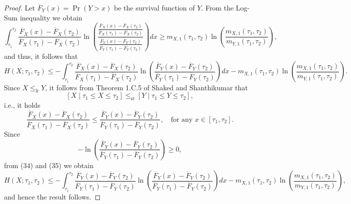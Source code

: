 \documentclass[11pt]{article}
\begin{document}
\begin{proof}
	Let $\overline{F}_Y(x)=\Pr(Y>x)$ be the survival function of $Y$. From the Log-Sum inequality we obtain
	\begin{equation}
			\textstyle \int_{\tau_1}^{\tau_2} \frac{\overline{F}_X(x)-\overline{F}_X(\tau_2)}{\overline{F}_X(\tau_1)-\overline{F}_X(\tau_2)} \ln\left( \frac{ \frac{\overline{F}_X(x)-\overline{F}_X(\tau_2)}{\overline{F}_X(\tau_1)-\overline{F}_X(\tau_2)} }{ \frac{\overline{F}_Y(x)-\overline{F}_Y(\tau_2)}{\overline{F}_Y(\tau_1)-\overline{F}_Y(\tau_2)} } \right)dx \geq m_{X,1}(\tau_1,\tau_2 ) \ln\left( \frac{m_{X,1}(\tau_1,\tau_2 )}{m_{Y,1}(\tau_1,\tau_2 )} \right),
	\end{equation}
	and thus, it follows that
	\begin{equation}
			\textstyle H(X;\tau_1,\tau_2 ) \leq -\int_{\tau_1}^{\tau_2} \frac{\overline{F}_X(x)-\overline{F}_X(\tau_2)}{\overline{F}_X(\tau_1)-\overline{F}_X(\tau_2)} \ln\left( \frac{\overline{F}_Y(x)-\overline{F}_Y(\tau_2)}{\overline{F}_Y(\tau_1)-\overline{F}_Y(\tau_2)} \right)dx - m_{X,1}(\tau_1,\tau_2 ) \ln\left( \frac{m_{X,1}(\tau_1,\tau_2 )}{m_{Y,1}(\tau_1,\tau_2 )} \right).
	\end{equation}
	Since $X\leq_{\text{lr}} Y$, it follows from Theorem 1.C.5 of Shaked and Shanthikumar \cite{Shaked2007} that
	$$ \textstyle [X \mid \tau_1 \leq X \leq \tau_2] \leq_{\text{st}} [Y \mid \tau_1 \leq Y \leq \tau_2], $$
	i.e., it holds
	\begin{equation}
		\textstyle \frac{\overline{F}_X(x)-\overline{F}_X(\tau_2)}{\overline{F}_X(\tau_1)-\overline{F}_X(\tau_2)} \leq \frac{\overline{F}_Y(x)-\overline{F}_Y(\tau_2)}{\overline{F}_Y(\tau_1)-\overline{F}_Y(\tau_2)}, \quad \text{for any } x\in[\tau_1,\tau_2].
	\end{equation}
	Since
	$$ -\ln\left( \frac{\overline{F}_Y(x)-\overline{F}_Y(\tau_2)}{\overline{F}_Y(\tau_1)-\overline{F}_Y(\tau_2)} \right) \geq 0, $$
	from (34) and (35) we obtain
	$$ \textstyle H(X;\tau_1,\tau_2 ) \leq -\int_{\tau_1}^{\tau_2} \frac{\overline{F}_Y(x)-\overline{F}_Y(\tau_2)}{\overline{F}_Y(\tau_1)-\overline{F}_Y(\tau_2)} \ln\left( \frac{\overline{F}_Y(x)-\overline{F}_Y(\tau_2)}{\overline{F}_Y(\tau_1)-\overline{F}_Y(\tau_2)} \right)dx - m_{X,1}(\tau_1,\tau_2 ) \ln\left( \frac{m_{X,1}(\tau_1,\tau_2 )}{m_{Y,1}(\tau_1,\tau_2 )} \right), $$
	and hence the result follows.
\end{proof}
\end{document}
